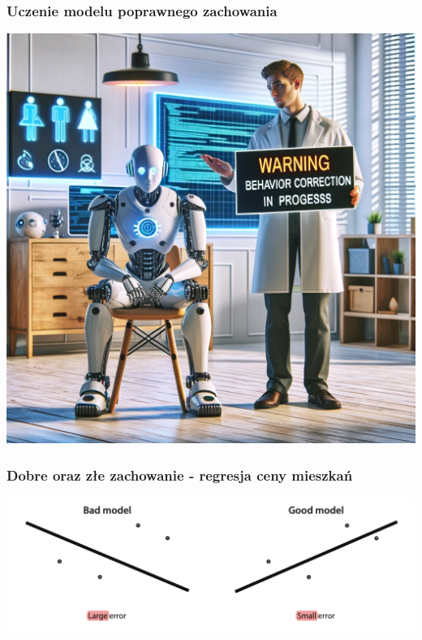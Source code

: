 \documentclass[smaller]{beamer}
\begin{document}
\begin{frame}
\frametitle{Uczenie modelu poprawnego zachowania}
    \centering
    \includegraphics[width=\textwidth,height=0.8\textheight,keepaspectratio]{../manifest/bad-model.png}
\end{frame}


\begin{frame}
\frametitle{Dobre oraz złe zachowanie - regresja ceny mieszkań}
    \centering
    \includegraphics[width=\textwidth,height=0.8\textheight,keepaspectratio]{../manifest/errors.png}
\end{frame}


\end{document}
